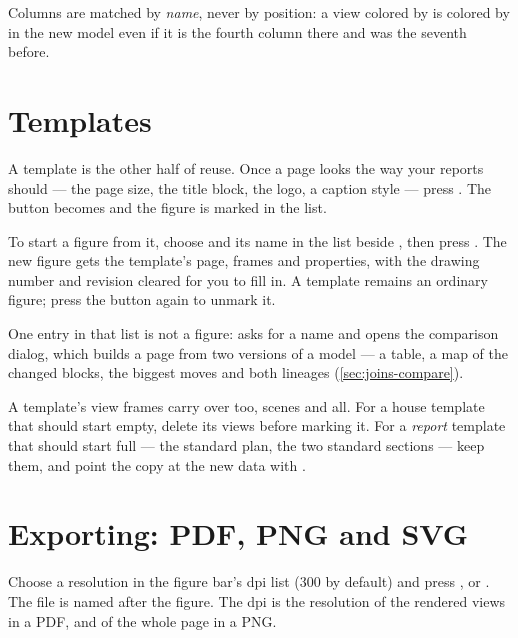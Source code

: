 Columns are matched by \emph{name}, never by position: a view colored by  is colored by  in the new model even if it is the fourth column there and was the seventh before.


\section{Templates}\label{sec:compo-templates}

A template is the other half of reuse. Once a page looks the way your reports should — the page size, the title block, the logo, a caption style — press . The button becomes  and the figure is marked in the list.

To start a figure from it, choose  and its name in the list beside , then press . The new figure gets the template's page, frames and properties, with the drawing number and revision cleared for you to fill in. A template remains an ordinary figure; press the button again to unmark it.

One entry in that list is not a figure:  asks for a name and opens the comparison dialog, which builds a page from two versions of a model — a table, a map of the changed blocks, the biggest moves and both lineages (\cref{sec:joins-compare}).

\begin{tip}
A template's view frames carry over too, scenes and all. For a house template that should start empty, delete its views before marking it. For a \emph{report} template that should start full — the standard plan, the two standard sections — keep them, and point the copy at the new data with .
\end{tip}

\section{Exporting: PDF, PNG and SVG}\label{sec:compo-pdf}

Choose a resolution in the figure bar's dpi list (300 by default) and press ,  or . The file is named after the figure. The dpi is the resolution of the rendered views in a PDF, and of the whole page in a PNG.

